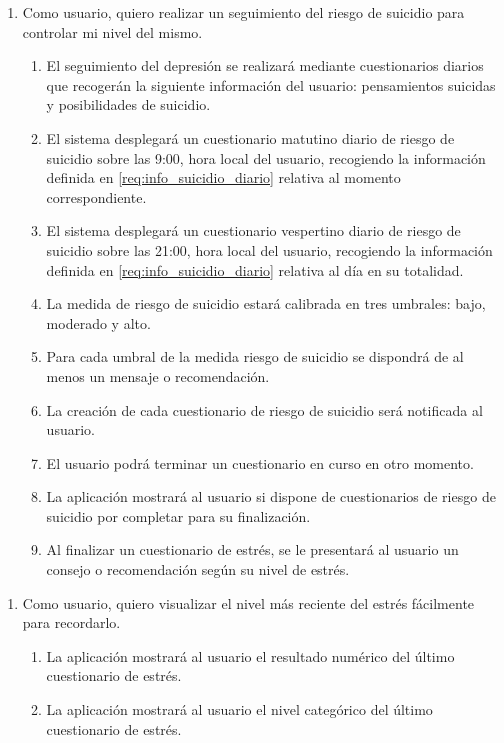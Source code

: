         \begin{enumerate}[resume=req-usuario,label=\textbf{\texttt{RU-\arabic*}}]
            \item Como usuario, quiero realizar un seguimiento del riesgo de suicidio para controlar mi nivel del mismo.
            \begin{enumerate}[resume=req-funcionales,label=\textbf{\texttt{RF-\arabic*}}]
                \item \label{req:info_suicidio_diario} El seguimiento del depresión se realizará mediante cuestionarios diarios que recogerán la siguiente información del usuario: pensamientos suicidas y posibilidades de suicidio.
                \item El sistema desplegará un cuestionario matutino diario de riesgo de suicidio sobre las 9:00, hora local del usuario, recogiendo la información definida en \ref{req:info_suicidio_diario} relativa al momento correspondiente.
                \item  El sistema desplegará un cuestionario vespertino diario de riesgo de suicidio sobre las 21:00, hora local del usuario, recogiendo la información definida en \ref{req:info_suicidio_diario} relativa al día en su totalidad.
                \item La medida de riesgo de suicidio estará calibrada en tres umbrales: bajo, moderado y alto.
                \item Para cada umbral de la medida riesgo de suicidio se dispondrá de al menos un mensaje o recomendación.
                \item La creación de cada cuestionario de riesgo de suicidio será notificada al usuario.
                \item El usuario podrá terminar un cuestionario en curso en otro momento.
                \item La aplicación mostrará al usuario si dispone de cuestionarios de riesgo de suicidio por completar para su finalización.
                \item Al finalizar un cuestionario de estrés, se le presentará al usuario un consejo o recomendación según su nivel de estrés.
            \end{enumerate}
        \end{enumerate}
        \begin{enumerate}[resume=req-usuario,label=\textbf{\texttt{RU-\arabic*}}]
            \item Como usuario, quiero visualizar el nivel más reciente del estrés fácilmente para recordarlo.
            \begin{enumerate}[resume=req-funcionales,label=\textbf{\texttt{RF-\arabic*}}]
                \item La aplicación mostrará al usuario el resultado numérico del último cuestionario de estrés.
                \item La aplicación mostrará al usuario el nivel categórico del último cuestionario de estrés.
            \end{enumerate}
        \end{enumerate}
